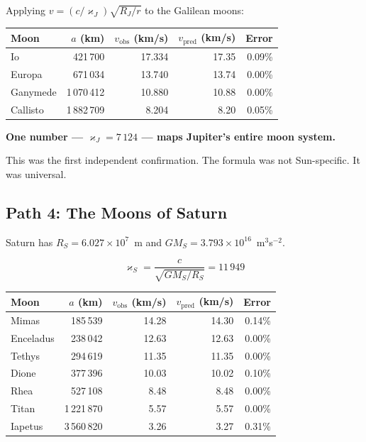 \documentclass[twocolumn,epjc3]{svjour3}
\newcommand{\kop}{\varkappa}  %
\begin{document}
Applying $v = (c/\kop_J)\sqrt{R_J/r}$ to the Galilean moons:

\begin{center}
\small
\begin{tabular}{lrrrr}
\toprule
\textbf{Moon} & $a$ (km) & $v_{\text{obs}}$ (km/s) & $v_{\text{pred}}$ (km/s) & Error \\
\midrule
Io       & 421\,700  & 17.334 & 17.35 & 0.09\% \\
Europa   & 671\,034  & 13.740 & 13.74 & 0.00\% \\
Ganymede & 1\,070\,412 & 10.880 & 10.88 & 0.00\% \\
Callisto & 1\,882\,709 &  8.204 &  8.20 & 0.05\% \\
\bottomrule
\end{tabular}
\end{center}

\textbf{One number --- $\kop_J = 7\,124$ --- maps Jupiter's entire moon system.}

This was the first independent confirmation.  The formula was not Sun-specific.  It was universal.


\subsection{Path 4: The Moons of Saturn}
\label{sec:path4}

Saturn has $R_S = 6.027 \times 10^7$~m and $GM_S = 3.793 \times 10^{16}$~m$^3$s$^{-2}$.

\begin{equation}
  \kop_S = \frac{c}{\sqrt{GM_S/R_S}} = 11\,949
\end{equation}

\begin{center}
\small
\begin{tabular}{lrrrr}
\toprule
\textbf{Moon} & $a$ (km) & $v_{\text{obs}}$ (km/s) & $v_{\text{pred}}$ (km/s) & Error \\
\midrule
Mimas    & 185\,539  & 14.28 & 14.30 & 0.14\% \\
Enceladus& 238\,042  & 12.63 & 12.63 & 0.00\% \\
Tethys   & 294\,619  & 11.35 & 11.35 & 0.00\% \\
Dione    & 377\,396  & 10.03 & 10.02 & 0.10\% \\
Rhea     & 527\,108  &  8.48 &  8.48 & 0.00\% \\
Titan    & 1\,221\,870 &  5.57 &  5.57 & 0.00\% \\
Iapetus  & 3\,560\,820 &  3.26 &  3.27 & 0.31\% \\
\bottomrule
\end{tabular}
\end{center}
\end{document}

